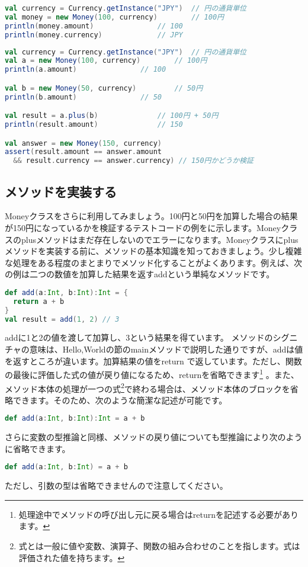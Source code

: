 \begin{lstlisting}[language=scala, label=src:money_100yen, caption=100円を表すコード]
val currency = Currency.getInstance("JPY")	// 円の通貨単位
val money = new Money(100, currency)		// 100円
println(money.amount)				// 100
println(money.currency)				// JPY 
\end{lstlisting}

\begin{lstlisting}[language=scala, label=src:money_test, caption=100円と50円を加算した結果が150円になっているかを検証するテストコード。Moneyクラスのplusメソッドはまだ存在しないので実行するとエラーになる]
val currency = Currency.getInstance("JPY")	// 円の通貨単位
val a = new Money(100, currency)		// 100円
println(a.amount)				// 100

val b = new Money(50, currency)			// 50円
println(b.amount)				// 50

val result = a.plus(b)				// 100円 + 50円
println(result.amount)				// 150

val answer = new Money(150, currency)
assert(result.amount == answer.amount 
  && result.currency == answer.currency) // 150円かどうか検証 
\end{lstlisting}

\subsection{メソッドを実装する}
Moneyクラスをさらに利用してみましょう。100円と50円を加算した場合の結果が150円になっているかを検証するテストコードの例をに示します。Moneyクラスのplusメソッドはまだ存在しないのでエラーになります。Moneyクラスにplusメソッドを実装する前に、メソッドの基本知識を知っておきましょう。少し複雑な処理をある程度のまとまりでメソッド化することがよくあります。例えば、次の例は二つの数値を加算した結果を返すaddという単純なメソッドです。 
\begin{lstlisting}[language=scala, frame=none]
def add(a:Int, b:Int):Int = {
  return a + b
}
val result = add(1, 2) // 3
\end{lstlisting}
addに1と2の値を渡して加算し、3という結果を得ています。 メソッドのシグニチャの意味は、Hello,Worldの節のmainメソッドで説明した通りですが、addは値を返すところが違います。加算結果の値をreturn で返しています。ただし、関数の最後に評価した式の値が戻り値になるため、returnを省略できます\footnote{処理途中でメソッドの呼び出し元に戻る場合はreturnを記述する必要があります。} 。また、メソッド本体の処理が一つの式\footnote{式とは一般に値や変数、演算子、関数の組み合わせのことを指します。式は評価された値を持ちます。}で終わる場合は、メソッド本体のブロックを省略できます。そのため、次のような簡潔な記述が可能です。
\begin{lstlisting}[language=scala, frame=none]
def add(a:Int, b:Int):Int = a + b
\end{lstlisting}
さらに変数の型推論と同様、メソッドの戻り値についても型推論により次のように省略できます。
\begin{lstlisting}[language=scala, frame=none]
def add(a:Int, b:Int) = a + b
\end{lstlisting}
ただし、引数の型は省略できませんので注意してください。 

